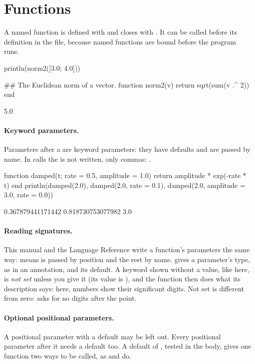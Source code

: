 \documentclass[11pt,a4paper,openany]{report}
\begin{document}
{{\section{Functions}

A named function is defined with  and closes with . It
can be called before its definition in the file, because named functions are
bound before the program runs.

\begin{axon}
println(norm2([3.0; 4.0]))

## The Euclidean norm of a vector.
function norm2(v)
  return sqrt(sum(v .^ 2))
end
\end{axon}
\begin{axonout}
5.0
\end{axonout}

\paragraph{Keyword parameters.} Parameters after a \code{;} are keyword
parameters: they have defaults and are passed by name. In calls the \code{;}
is not written, only commas: .

\begin{axon}
function damped(t; rate = 0.5, amplitude = 1.0)
  return amplitude * exp(-rate * t)
end
println(damped(2.0), damped(2.0, rate = 0.1), damped(2.0, amplitude = 3.0, rate = 0.0))
\end{axon}
\begin{axonout}
0.367879441171442 0.818730753077982 3.0
\end{axonout}

\paragraph{Reading signatures.} This manual and the Language Reference write
a function's parameters the same way:
 means  is passed
by position and the rest by name.  gives a parameter's type, as in
an annotation, and  its default. A keyword shown without a value,
like  here, is \emph{not set} unless you give it (its value is
), and the function then does what its description says: here,
numbers show their significant digits. Not set is different from zero:
 asks for no digits after the point.

\paragraph{Optional positional parameters.} A positional parameter with a
default may be left out. Every positional parameter after it needs a default
too. A default of , tested in the body, gives one function two
ways to be called, as  and  do.

}}
\end{document}

